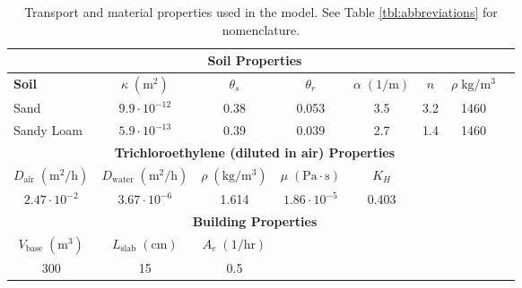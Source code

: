 \begin{table}[htb!]
  \setlength{\tabcolsep}{1pt}
  \centering
  \begin{tabular}{l c c c c c c c}
    \toprule
    \multicolumn{7}{c}{\textbf{Soil Properties}\cite{abreu_conceptual_2012,u.s._environmental_protection_agency_userss_2004}} \\
    \midrule
    \textbf{Soil} & \textbf{$\kappa \; \mathrm{(m^2)}$} & \textbf{$\theta_s$} & \textbf{$\theta_r$} & \textbf{$\alpha \; \mathrm{(1/m)}$} & \textbf{$n$} & \textbf{$\rho \; \mathrm{kg/m^3}$} \\
    Sand & $9.9 \cdot 10^{-12}$ & 0.38 & 0.053 & 3.5 & 3.2 & 1460 \\
    Sandy Loam & $5.9 \cdot 10^{-13}$ & 0.39 & 0.039 & 2.7 & 1.4 & 1460 \\
    \midrule
    \multicolumn{7}{c}{\textbf{Trichloroethylene (diluted in air) Properties}\cite{abreu_conceptual_2012,u.s._environmental_protection_agency_userss_2004}} \\
    \midrule
    \multicolumn{1}{c}{\textbf{$D_\mathrm{air} \; \mathrm{(m^2/h)}$}} & \textbf{$D_\mathrm{water} \; \mathrm{(m^2/h)}$} & \textbf{$\rho \; \mathrm{(kg/m^3)}$} & \textbf{$\mu \; \mathrm{(Pa \cdot s)}$} & \textbf{$K_H$} \\
    \multicolumn{1}{c}{$2.47 \cdot 10^{-2}$} & $3.67 \cdot 10^{-6}$ & 1.614 & $1.86 \cdot 10^{-5}$ & 0.403 \\
    \midrule
    \multicolumn{7}{c}{\textbf{Building Properties}} \\
    \midrule
    \multicolumn{1}{c}{\textbf{$V_\mathrm{base} \; \mathrm{(m^3)}$}} & \textbf{$L_\mathrm{slab} \; \mathrm{(cm)}$} & \textbf{$A_e \; \mathrm{(1/hr)}$} \\
    \multicolumn{1}{c}{300} & 15 & 0.5 \\
    \bottomrule
  \end{tabular}
  \caption{Transport and material properties used in the model. See Table \ref{tbl:abbreviations} for nomenclature.}\label{tbl:model}
\end{table}
